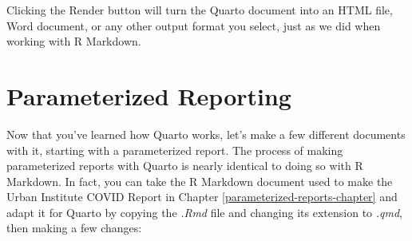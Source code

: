 \documentclass[
]{book}
\begin{document}
Clicking the Render button will turn the Quarto document into an HTML file, Word document, or any other output format you select, just as we did when working with R Markdown.

\hypertarget{parameterized-reporting}{%
\section*{Parameterized Reporting}\label{parameterized-reporting}}

Now that you've learned how Quarto works, let's make a few different documents with it, starting with a parameterized report. The process of making parameterized reports with Quarto is nearly identical to doing so with R Markdown. In fact, you can take the R Markdown document used to make the Urban Institute COVID Report in Chapter \ref{parameterized-reports-chapter} and adapt it for Quarto by copying the \emph{.Rmd} file and changing its extension to \emph{.qmd}, then making a few changes:
\end{document}
